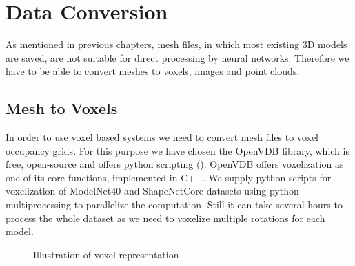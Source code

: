 \section{Data Conversion}
As mentioned in previous chapters,  mesh files, in which most existing 3D models are saved, are not suitable for direct processing by neural networks. Therefore we have to be able to convert meshes to voxels, images and point clouds.

\subsection{Mesh to Voxels}
In order to use voxel based systems we need to convert mesh files to voxel occupancy grids. For this purpose we have chosen the OpenVDB library, which is free, open-source and offers python scripting (\cite{museth_openvdb:_2013}). OpenVDB offers voxelization as one of its core functions, implemented in C++. We supply python scripts for voxelization of ModelNet40 and ShapeNetCore datasets using python multiprocessing to parallelize the computation. Still it can take several hours to process the whole dataset as we need to voxelize multiple rotations for each model. 

\begin{figure}[!h]
	\centering
	\qquad
	\caption{Illustration of voxel representation}
\end{figure}


